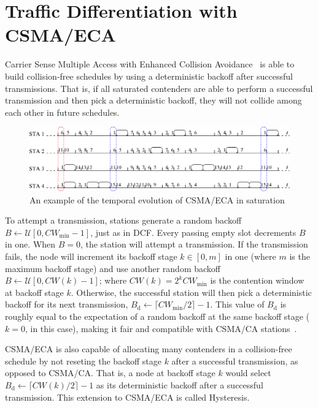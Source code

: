 \section{Traffic Differentiation with CSMA/ECA}\label{section3}
Carrier Sense Multiple Access with Enhanced Collision Avoidance~\cite{sanabria2014high, research2standards} is able to build collision-free schedules by using a deterministic backoff after successful transmissions. That is, if all saturated contenders are able to perform a successful transmission and then pick a deterministic backoff, they will not collide among each other in future schedules.

	\begin{figure}[tb]
	\centering
		\includegraphics[width=0.8\linewidth]{figures/csma_eca_different_backoff_short.eps}
		\caption{An example of the temporal evolution of CSMA/ECA in saturation}
		\label{fig:ECA}
	\end{figure}
	
To attempt a transmission, stations generate a random backoff $B\leftarrow\mathcal{U}[0,CW_{\min}-1]$, just as in DCF. Every passing empty slot decrements $B$ in one. When $B=0$, the station will attempt a transmission. If the transmission fails, the node will increment its backoff stage $k\in[0,m]$ in one (where $m$ is the maximum backoff stage) and use another random backoff $B\leftarrow\mathcal{U}[0,CW(k)-1]$; where $CW(k)=2^{k}CW_{\min}$ is the contention window at backoff stage $k$. Otherwise, the successful station will then pick a deterministic backoff for its next transmission, $B_{\text{d}}\leftarrow \lceil CW_{\min}/2\rceil-1$. This value of $B_{\text{d}}$ is roughly equal to the expectation of a random backoff at the same backoff stage ($k=0$, in this case), making it fair and compatible with CSMA/CA stations~\cite{research2standards}.

CSMA/ECA is also capable of allocating many contenders in a collision-free schedule by not reseting the backoff stage $k$ after a successful transmission, as opposed to CSMA/CA. That is, a node at backoff stage $k$ would select $B_{\text{d}}\leftarrow \lceil CW(k)/2\rceil-1$ as its deterministic backoff after a successful transmission. This extension to CSMA/ECA is called Hysteresis. 

